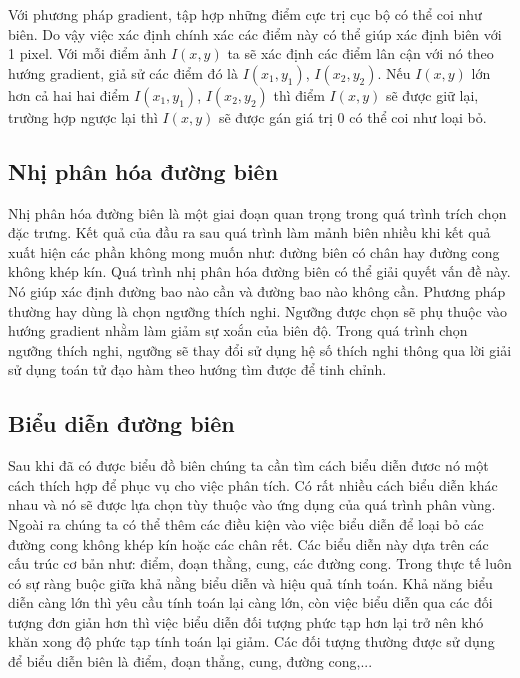 \documentclass[12pt, oneside, a4paper]{book}
\begin{document}
Với phương pháp gradient, tập hợp những điểm cực trị cục bộ có thể coi như biên. Do vậy việc xác định chính xác các điểm này có thể giúp xác định biên với 1 pixel. Với mỗi điểm ảnh $I(x,y)$ ta sẽ xác định các điểm lân cận với  nó theo hướng gradient, giả sử các điểm đó là $I(x_1,y_1)$, $I(x_2,y_2)$. Nếu $I(x,y)$ lớn hơn cả hai hai điểm $I(x_1,y_1)$, $I(x_2,y_2)$  thì điểm $I(x,y)$ sẽ được giữ lại, trường hợp ngược lại thì $I(x,y)$ sẽ được gán giá trị 0 có thể coi như loại bỏ. 
\subsection{Nhị phân hóa đường biên}
Nhị phân hóa đường biên là một giai đoạn quan trọng trong quá trình trích chọn đặc trưng. Kết quả của đầu ra sau quá trình làm mảnh biên nhiều khi kết quả xuất hiện các phần không mong muốn như: đường biên có chân hay đường cong không khép kín. Quá trình nhị phân hóa đường biên có thể giải quyết vấn đề này. Nó giúp xác định đường bao nào cần và đường bao nào không cần. Phương pháp thường hay dùng là chọn ngưỡng thích nghi. Ngưỡng được chọn sẽ phụ thuộc vào  hướng gradient nhằm làm giảm sự xoắn của biên độ. Trong quá trình chọn ngưỡng thích nghi, ngưỡng sẽ thay đổi sử dụng   hệ số thích nghi thông qua lời giải sử dụng toán tử đạo hàm theo hướng tìm được để tinh chỉnh. 
\subsection{Biểu diễn đường biên}
Sau khi đã có được biểu đồ biên chúng ta cần tìm cách biểu diễn đươc nó một cách thích hợp để phục vụ cho việc phân tích. Có rất nhiều cách biểu diễn khác nhau và nó sẽ được lựa chọn  tùy thuộc vào ứng dụng của quá trình phân vùng. Ngoài ra chúng ta có thể thêm các điều kiện vào việc biểu diễn để loại bỏ các đường cong không khép kín hoặc các chân rết.  Các biểu diễn này dựa trên các cấu trúc cơ bản như: điểm, đoạn thằng, cung, các đường cong. Trong thực tế luôn có sự ràng buộc giữa khả nằng biểu diễn và hiệu quả tính toán. Khả năng biểu diễn càng lớn thì yêu cầu tính toán lại càng lớn, còn việc biểu diễn qua các đối tượng đơn giản hơn thì việc biểu diễn đối tượng phức tạp hơn lại trở nên khó khăn xong độ phức tạp tính toán lại giảm. Các đối tượng thường được sử dụng để biểu diễn biên là điểm, đoạn thẳng, cung, đường cong,...
\end{document}
